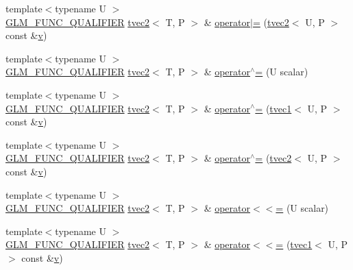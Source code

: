 \begin{DoxyCompactItemize}
\item 
{\footnotesize template$<$typename U $>$ }\\\mbox{\hyperlink{setup_8hpp_a33fdea6f91c5f834105f7415e2a64407}{G\+L\+M\+\_\+\+F\+U\+N\+C\+\_\+\+Q\+U\+A\+L\+I\+F\+I\+ER}} \mbox{\hyperlink{structglm_1_1tvec2}{tvec2}}$<$ T, P $>$ \& \mbox{\hyperlink{structglm_1_1tvec2_aa36fb52ee5d9c58525c1e82edfdadc70}{operator$\vert$=}} (\mbox{\hyperlink{structglm_1_1tvec2}{tvec2}}$<$ U, P $>$ const \&\mbox{\hyperlink{glad_8h_a14cfbe2fc2234f5504618905b69d1e06}{v}})
\item 
{\footnotesize template$<$typename U $>$ }\\\mbox{\hyperlink{setup_8hpp_a33fdea6f91c5f834105f7415e2a64407}{G\+L\+M\+\_\+\+F\+U\+N\+C\+\_\+\+Q\+U\+A\+L\+I\+F\+I\+ER}} \mbox{\hyperlink{structglm_1_1tvec2}{tvec2}}$<$ T, P $>$ \& \mbox{\hyperlink{structglm_1_1tvec2_a5026bdfe8ccedecefd92963b117b33d3}{operator$^\wedge$=}} (U scalar)
\item 
{\footnotesize template$<$typename U $>$ }\\\mbox{\hyperlink{setup_8hpp_a33fdea6f91c5f834105f7415e2a64407}{G\+L\+M\+\_\+\+F\+U\+N\+C\+\_\+\+Q\+U\+A\+L\+I\+F\+I\+ER}} \mbox{\hyperlink{structglm_1_1tvec2}{tvec2}}$<$ T, P $>$ \& \mbox{\hyperlink{structglm_1_1tvec2_a2b88448c05b92b3a1f32b19f0698a53a}{operator$^\wedge$=}} (\mbox{\hyperlink{structglm_1_1tvec1}{tvec1}}$<$ U, P $>$ const \&\mbox{\hyperlink{glad_8h_a14cfbe2fc2234f5504618905b69d1e06}{v}})
\item 
{\footnotesize template$<$typename U $>$ }\\\mbox{\hyperlink{setup_8hpp_a33fdea6f91c5f834105f7415e2a64407}{G\+L\+M\+\_\+\+F\+U\+N\+C\+\_\+\+Q\+U\+A\+L\+I\+F\+I\+ER}} \mbox{\hyperlink{structglm_1_1tvec2}{tvec2}}$<$ T, P $>$ \& \mbox{\hyperlink{structglm_1_1tvec2_a97ae34925859e7738cf400ecc4880190}{operator$^\wedge$=}} (\mbox{\hyperlink{structglm_1_1tvec2}{tvec2}}$<$ U, P $>$ const \&\mbox{\hyperlink{glad_8h_a14cfbe2fc2234f5504618905b69d1e06}{v}})
\item 
{\footnotesize template$<$typename U $>$ }\\\mbox{\hyperlink{setup_8hpp_a33fdea6f91c5f834105f7415e2a64407}{G\+L\+M\+\_\+\+F\+U\+N\+C\+\_\+\+Q\+U\+A\+L\+I\+F\+I\+ER}} \mbox{\hyperlink{structglm_1_1tvec2}{tvec2}}$<$ T, P $>$ \& \mbox{\hyperlink{structglm_1_1tvec2_a6afc7e45c6438990e7cd48b03369e79c}{operator$<$$<$=}} (U scalar)
\item 
{\footnotesize template$<$typename U $>$ }\\\mbox{\hyperlink{setup_8hpp_a33fdea6f91c5f834105f7415e2a64407}{G\+L\+M\+\_\+\+F\+U\+N\+C\+\_\+\+Q\+U\+A\+L\+I\+F\+I\+ER}} \mbox{\hyperlink{structglm_1_1tvec2}{tvec2}}$<$ T, P $>$ \& \mbox{\hyperlink{structglm_1_1tvec2_a4ee968bac5e887631cb05668dd34da58}{operator$<$$<$=}} (\mbox{\hyperlink{structglm_1_1tvec1}{tvec1}}$<$ U, P $>$ const \&\mbox{\hyperlink{glad_8h_a14cfbe2fc2234f5504618905b69d1e06}{v}})

\end{DoxyCompactItemize}
